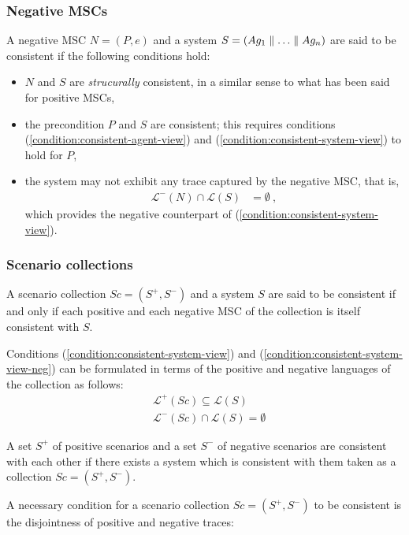 \subsubsection*{Negative MSCs}

A negative MSC $N = (P,e)$ and a system $S = (Ag_1 \parallel \ldots \parallel Ag_n)$ are said to be consistent if the following conditions hold:

\begin{itemize}
\item $N$ and $S$ are \emph{strucurally} consistent, in a similar sense to what has been said for positive MSCs,

\item the precondition $P$ and $S$ are consistent; this requires conditions (\ref{condition:consistent-agent-view}) and (\ref{condition:consistent-system-view}) to hold for $P$,

\item the system may not exhibit any trace captured by the negative MSC, that is,
\begin{align}\mathcal{L}^{-}(N) \cap \mathcal{L}(S) &= \emptyset~,\label{condition:consistent-system-view-neg}\end{align}
which provides the negative counterpart of (\ref{condition:consistent-system-view}).
\end{itemize}

\subsubsection*{Scenario collections}

A scenario collection $Sc = (S^+,S^-)$ and a system $S$ are said to be consistent if and only if each positive and each negative MSC of the collection is itself consistent with $S$. 

Conditions (\ref{condition:consistent-system-view}) and (\ref{condition:consistent-system-view-neg}) can be formulated in terms of the positive and negative languages of the collection as follows:
\begin{align}
&\mathcal{L}^+(Sc) \subseteq \mathcal{L}(S) \\
&\mathcal{L}^-(Sc) \cap \mathcal{L}(S) = \emptyset
\end{align}

A set $S^+$ of positive scenarios and a set $S^-$ of negative scenarios are consistent with each other if there exists a system which is consistent with them taken as a collection $Sc = (S^+,S^-)$. 

A necessary condition for a scenario collection $Sc = (S^+,S^-)$ to be consistent is the disjointness of positive and negative traces:

